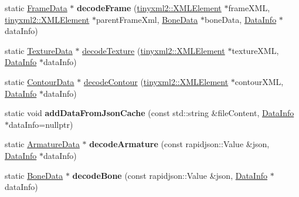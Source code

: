\begin{DoxyCompactItemize}
\item 
\mbox{\label{classcocostudio_1_1DataReaderHelper_ad3f2d7a00faeb9531f4b04579ccce76e}} 
static \hyperlink{classcocostudio_1_1FrameData}{Frame\+Data} $\ast$ {\bfseries decode\+Frame} (\hyperlink{classtinyxml2_1_1XMLElement}{tinyxml2\+::\+X\+M\+L\+Element} $\ast$frame\+X\+ML, \hyperlink{classtinyxml2_1_1XMLElement}{tinyxml2\+::\+X\+M\+L\+Element} $\ast$parent\+Frame\+Xml, \hyperlink{classcocostudio_1_1BoneData}{Bone\+Data} $\ast$bone\+Data, \hyperlink{structcocostudio_1_1DataReaderHelper_1_1__DataInfo}{Data\+Info} $\ast$data\+Info)
\item 
static \hyperlink{classcocostudio_1_1TextureData}{Texture\+Data} $\ast$ \hyperlink{classcocostudio_1_1DataReaderHelper_a7f509df8d383c000c81df30bafd2b8e7}{decode\+Texture} (\hyperlink{classtinyxml2_1_1XMLElement}{tinyxml2\+::\+X\+M\+L\+Element} $\ast$texture\+X\+ML, \hyperlink{structcocostudio_1_1DataReaderHelper_1_1__DataInfo}{Data\+Info} $\ast$data\+Info)
\item 
static \hyperlink{classcocostudio_1_1ContourData}{Contour\+Data} $\ast$ \hyperlink{classcocostudio_1_1DataReaderHelper_ae8ab97715ed14e3cb645f5aaca70e916}{decode\+Contour} (\hyperlink{classtinyxml2_1_1XMLElement}{tinyxml2\+::\+X\+M\+L\+Element} $\ast$contour\+X\+ML, \hyperlink{structcocostudio_1_1DataReaderHelper_1_1__DataInfo}{Data\+Info} $\ast$data\+Info)
\item 
\mbox{\label{classcocostudio_1_1DataReaderHelper_ab3d6cae5ae7992b3c76eb1ed4dbdf17d}} 
static void {\bfseries add\+Data\+From\+Json\+Cache} (const std\+::string \&file\+Content, \hyperlink{structcocostudio_1_1DataReaderHelper_1_1__DataInfo}{Data\+Info} $\ast$data\+Info=nullptr)
\item 
\mbox{\label{classcocostudio_1_1DataReaderHelper_a96cddcabceb6d41c8881606258bc54fe}} 
static \hyperlink{classcocostudio_1_1ArmatureData}{Armature\+Data} $\ast$ {\bfseries decode\+Armature} (const rapidjson\+::\+Value \&json, \hyperlink{structcocostudio_1_1DataReaderHelper_1_1__DataInfo}{Data\+Info} $\ast$data\+Info)
\item 
\mbox{\label{classcocostudio_1_1DataReaderHelper_a99b09ced1676694499bf06d740298a2a}} 
static \hyperlink{classcocostudio_1_1BoneData}{Bone\+Data} $\ast$ {\bfseries decode\+Bone} (const rapidjson\+::\+Value \&json, \hyperlink{structcocostudio_1_1DataReaderHelper_1_1__DataInfo}{Data\+Info} $\ast$data\+Info)

\end{DoxyCompactItemize}
